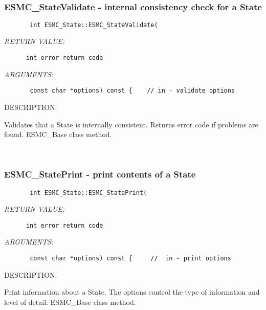 \mbox{}\hrulefill\ 
 
\subsubsection{ESMC\_StateValidate - internal consistency check for a State}


  
\begin{verbatim}       int ESMC_State::ESMC_StateValidate(\end{verbatim}{\em RETURN VALUE:}
\begin{verbatim}      int error return code\end{verbatim}{\em ARGUMENTS:}
\begin{verbatim}       const char *options) const {    // in - validate options\end{verbatim}
{\sf DESCRIPTION:\\ }


        Validates that a State is internally consistent.
        Returns error code if problems are found.  ESMC\_Base class method.
   
 
\mbox{}\hrulefill\ 
 
\subsubsection{ESMC\_StatePrint - print contents of a State}


  
\begin{verbatim}       int ESMC_State::ESMC_StatePrint(\end{verbatim}{\em RETURN VALUE:}
\begin{verbatim}      int error return code\end{verbatim}{\em ARGUMENTS:}
\begin{verbatim}       const char *options) const {     //  in - print options\end{verbatim}
{\sf DESCRIPTION:\\ }


        Print information about a State.  The options control the
        type of information and level of detail.  ESMC\_Base class method.
   
 
\mbox{}\hrulefill\ 
 
